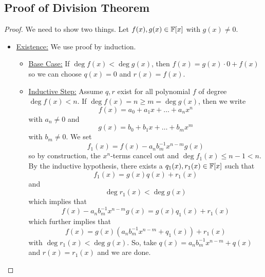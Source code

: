 \documentclass[letterpaper]{article}
\begin{document}
\subsection{Proof of Division Theorem}
\begin{mdframed}[]
    \begin{proof}
        We need to show two things. Let $f(x), g(x) \in \mathbb{F}[x]$ with $g(x) \neq 0$.
        \begin{itemize}
            \item \underline{Existence:} We use proof by induction. 
            \begin{itemize}
                \item \underline{Base Case:} If $\deg f(x) < \deg g(x)$, then $f(x) = g(x) \cdot 0 + f(x)$ so we can choose $q(x) = 0$ and $r(x) = f(x)$. 
                \item \underline{Inductive Step:} Assume $q, r$ exist for all polynomial $f$ of degree $\deg f(x) < n$. If $\deg f(x) = n \geq m = \deg g(x)$, then we write 
                \[f(x) = a_0 + a_1 x + \dots + a_n x^n\]
                with $a_n \neq 0$ and
                \[g(x) = b_0 + b_1 x + \dots + b_m x^m\]
                with $b_m \neq 0$. We set 
                \[f_{1}(x) = f(x) - a_n b_{m}^{-1} x^{n - m} g(x)\]
                so by construction, the $x^n$-terms cancel out and $\deg f_{1}(x) \leq n - 1 < n$. By the inductive hypothesis, there exists a $q_{1}(x), r_{1}(x) \in \mathbb{F}[x]$ such that
                \[f_{1}(x) = g(x)q(x) + r_{1}(x)\]
                and 
                \[\deg r_{1}(x) < \deg g(x)\]
                which implies that 
                \[f(x) - a_{n}b_{m}^{-1} x^{n - m} g(x) = g(x) q_{1}(x) + r_{1}(x)\]
                which further implies that 
                \[f(x) = g(x)(a_n b_{m}^{-1} x^{n - m} + q_{1}(x)) + r_{1}(x)\]
                with $\deg r_{1}(x) < \deg g(x)$. So, take $q(x) = a_n b_{m}^{-1} x^{n - m} + q(x)$ and $r(x) = r_{1}(x)$ and we are done. 
            \end{itemize}


\end{itemize}
\end{proof}
\end{mdframed}
\end{document}
